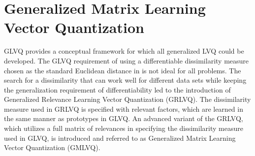 \section{Generalized Matrix Learning Vector Quantization}
GLVQ provides a conceptual framework for which all generalized LVQ could be developed. The GLVQ requirement of using a differentiable dissimilarity measure chosen as the standard Euclidean distance in \cite{sato1996generalized} is not ideal for all problems\cite{villmann2017can}. The search for a dissimilarity that can work well for different data sets while keeping the generalization requirement of differentiability led to the introduction of Generalized Relevance Learning Vector Quantization (GRLVQ)\cite{article}. The dissimilarity measure used in GRLVQ is specified with relevant factors, which are learned in the same manner as prototypes in GLVQ\cite{article}. An advanced variant of the GRLVQ, which utilizes a full matrix of relevances in specifying the dissimilarity measure used in GLVQ, is introduced and referred to as Generalized Matrix Learning Vector Quantization (GMLVQ)\cite{article}.

